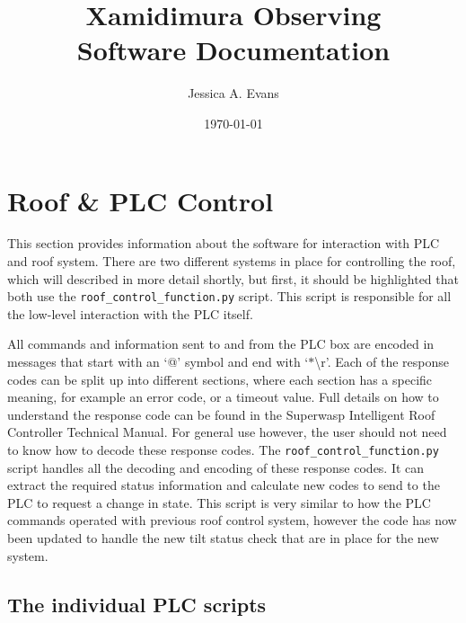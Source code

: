 \documentclass[a4paper,12pt]{article}
\begin{document}
{\huge{\title{\textbf{Xamidimura Observing \\Software Documentation}}}}
\author{Jessica A. Evans}
\date{\today}
\maketitle



\newpage
\tableofcontents
\newpage

\section{Roof \& PLC Control}

This section provides information about the software for interaction with PLC and roof system. There are two different systems in place for controlling the roof, which will described in more detail shortly, but first, it should be highlighted that both use the {\tt roof\_control\_function.py} script. This script is responsible for all the low-level interaction with the PLC itself.

All commands and information sent to and from the PLC box are encoded in messages that start with an `@' symbol and end with `$\ast$\textbackslash r'. Each of the response codes can be split up into different sections, where each section has a specific meaning, for example an error code, or a timeout value. Full details on how to understand the response code can be found in the Superwasp Intelligent Roof Controller Technical Manual. For general use however, the user should not need to know how to decode  these response codes. The {\tt roof\_control\_function.py} script handles all the decoding and encoding of these response codes. It can extract the required status information and calculate new codes to send to the PLC to request a change in state. This script is very similar to how the PLC commands operated with previous roof control system, however the code has now been updated to handle the new tilt status check that are in place for the new system.

\subsection{The individual PLC scripts}
\end{document}
